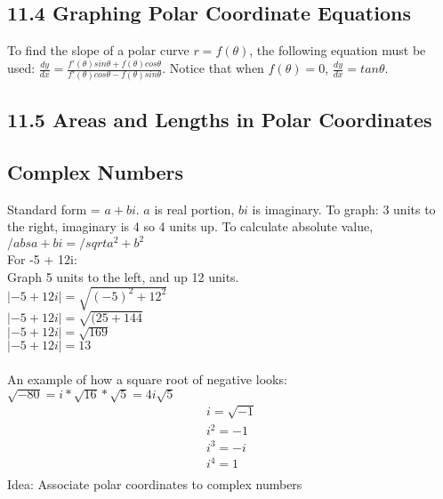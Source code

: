 \documentclass{article}
\begin{document}
        \subsection*{11.4 Graphing Polar Coordinate Equations}
            To find the slope of a polar curve $r=f(\theta)$, the following equation must be used: $\frac{dy}{dx} = \frac{f'(\theta)sin\theta + f(\theta)cos\theta}{f'(\theta)cos\theta - f(\theta)sin\theta}$. Notice that when $f(\theta) = 0$, $\frac{dy}{dx} = tan \theta$.
        \color{Black}
        \subsection*{11.5 Areas and Lengths in Polar Coordinates}
        \color{Aquamarine}
        \subsection*{Complex Numbers}
            Standard form = $a + bi$. $a$ is real portion, $bi$ is imaginary. 
            To graph: 3 units to the right, imaginary is 4 so 4 units up. To calculate absolute value, $/abs{a+bi} = /sqrt{a^2 + b^2}$\\
            For -5 + 12i: \\
            Graph 5 units to the left, and up 12 units. \\
            $\lvert {-5 + 12i}\rvert = \sqrt{(-5)^2 + 12^2}$ \\
            $\lvert {-5 + 12i}\rvert = \sqrt{(25 + 144}$ \\
            $\lvert {-5 + 12i}\rvert = \sqrt{169}$ \\
            $\lvert {-5 + 12i}\rvert = 13$ \\
            \\
            An example of how a square root of negative looks: $\sqrt{-80} =  i * \sqrt{16} * \sqrt{5} = 4i \sqrt{5}$
            \begin{equation}
                \begin{split}
                    i = \sqrt{-1} \\
                    i^2 = -1 \\
                    i^3 = -i \\
                    i^4 = 1 \\
                \end{split}
            \end{equation}
            Idea: Associate polar coordinates to complex numbers \\
\end{document}
